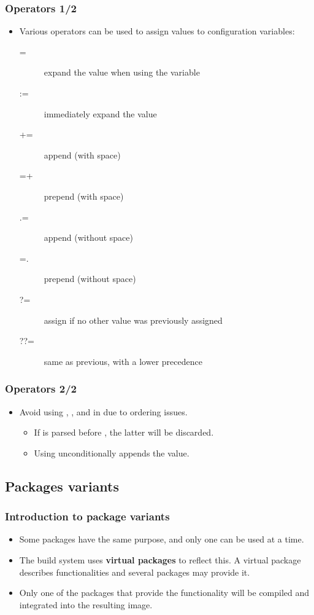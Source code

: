 \begin{frame}
  \frametitle{Operators 1/2}
  \begin{itemize}
    \item Various operators can be used to assign values to
    configuration variables:
      \begin{description}
        \item[=] expand the value when using the variable
        \item[:=] immediately expand the value
        \item[+=] append (with space)
        \item[=+] prepend (with space)
        \item[.=] append (without space)
        \item[=.] prepend (without space)
        \item[?=] assign if no other value was previously assigned
        \item[??=] same as previous, with a lower precedence
      \end{description}
  \end{itemize}
\end{frame}

\begin{frame}
  \frametitle{Operators 2/2}
  \begin{itemize}
    \item Avoid using \code{+=}, \code{=+},  and 
      in  due to ordering issues.
      \begin{itemize}
        \item If \code{+=} is parsed before , the latter will
          be discarded.
        \item Using  unconditionally appends the value.
      \end{itemize}
  \end{itemize}
\end{frame}

\subsection{Packages variants}

\begin{frame}
  \frametitle{Introduction to package variants}
  \begin{itemize}
    \item Some packages have the same purpose, and only one can be
      used at a time.
    \item The build system uses {\bf virtual packages} to reflect
      this. A virtual package describes functionalities and several
      packages may provide it.
    \item Only one of the packages that provide the functionality will
    be compiled and integrated into the resulting image.
  \end{itemize}
\end{frame}

